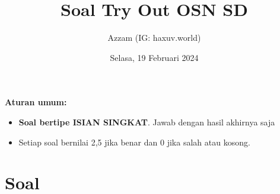 \documentclass[12pt]{scrartcl}
\title{Soal Try Out OSN SD}
\author{Azzam (IG: haxuv.world)}
\date{Selasa, 19 Februari 2024}
\begin{document}
\maketitle

\renewcommand*\contentsname{Daftar Isi}
\tableofcontents

\newpage
\textbf{Aturan umum:}
\begin{itemize}
    \item \textbf{Soal bertipe ISIAN SINGKAT}. Jawab dengan hasil akhirnya saja
    \item Setiap soal bernilai 2,5 jika benar dan 0 jika salah atau kosong.
\end{itemize}

\section{Soal}
\end{document}
